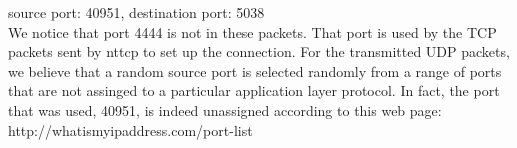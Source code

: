 source port: 40951, destination port: 5038 \\

We notice that port 4444 is not in these packets. That port is used by the TCP packets sent by nttcp to set up the connection.
For the transmitted UDP packets, we believe that a random source port is selected randomly from a range of ports that are not assinged to a particular application layer protocol. In fact, the port that was used, 40951, is indeed unassigned according to this web page: http://whatismyipaddress.com/port-list
